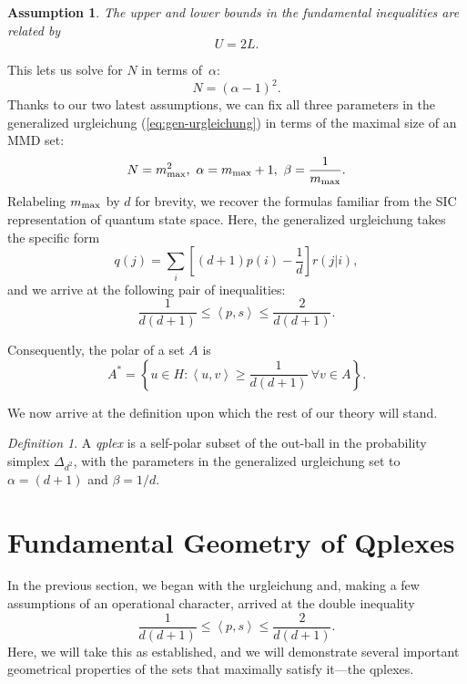 \documentclass[aps,pra,superscriptaddress,10pt,tightenlines,twocolumn,nofootinbib]{revtex4}
\newtheorem{assump}{Assumption}
\theoremstyle{remark}
\newtheorem{definition}{Definition}
\newcommand{\be}{\begin{equation}}
\newcommand{\ee}{\end{equation}}
\newcommand{\ps}{\Delta}
\newcommand{\dl}[1]{#1^{*}}
\newcommand{\inprod}[2]{{\left\langle #1 , #2 \right\rangle}}
\begin{document}
\begin{assump}
\label{assump:upper-and-lower}
The upper and lower bounds in the fundamental inequalities are related by
\begin{equation}
U = 2L.
\end{equation}
\end{assump}

This lets us solve for $N$ in terms of~$\alpha$:
\begin{equation}
N = (\alpha - 1)^2.
\end{equation}
Thanks to our two latest assumptions, we can fix all three parameters
in the generalized urgleichung (\ref{eq:gen-urgleichung}) in terms of
the maximal size of an MMD set:
\be 
N = m_{\rm max}^2,\ \alpha =
m_{\rm max} + 1,\ \beta = \frac{1}{m_{\rm max}}.
\ee
Relabeling $m_{\rm max}$ by $d$ for brevity, we recover the formulas
familiar from the SIC representation of quantum state space.  Here,
the generalized urgleichung takes the specific form
\be 
q(j) = \sum_{i}\left[(d+1)p(i)
  - \frac{1}{d}\right] r(j|i),
\ee
and we arrive at the following pair of
inequalities:
\begin{equation}
\frac{1}{d(d+1)} \leq \inprod{p}{s}
 \leq \frac{2}{d(d+1)}.
\label{eq:germ-defining}
\end{equation}

Consequently, the polar of a set $A$ is
\be
\dl{A} = \left\{ u \in H \colon \inprod{u}{v} \ge \frac{1}{d(d+1)} \ \forall v \in A\right\}.
\label{eq:our-def-polar}
\ee

We now arrive at the definition upon which the rest of our theory will stand.

\begin{definition}
A \emph{qplex} is a self-polar subset of the out-ball in the
probability simplex $\ps_{d^2}$, with the parameters in the
generalized urgleichung set to $\alpha = (d+1)$ and $\beta = 1/d$.
\end{definition}

\section{Fundamental Geometry of Qplexes}
\label{sec:polarity}
In the previous section, we began with the urgleichung and, making a
few assumptions of an operational character, arrived at the double
inequality
\begin{equation}
\frac{1}{d(d+1)} \leq \inprod{p}{s}
 \leq \frac{2}{d(d+1)}.
\label{eq:double-inequality-repeat}
\end{equation}
Here, we will take this as established, and we will demonstrate
several important geometrical properties of the sets that maximally
satisfy it---the qplexes.
\end{document}
